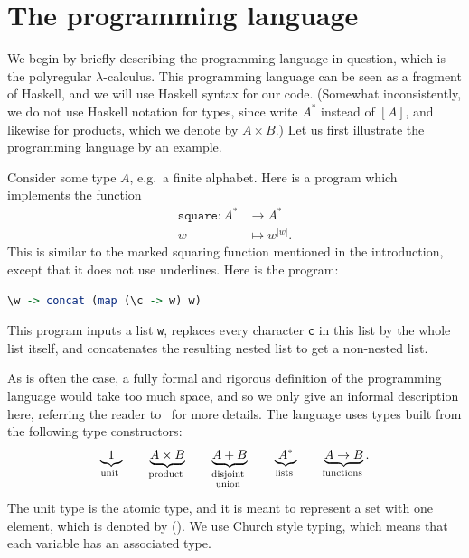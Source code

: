 \documentclass{article}
\begin{document}
\section{The programming language}
\label{sec:programming-language}
\newcommand{\leftterm}{\mathtt{Left}}
\newcommand{\rightterm}{\mathtt{Right}}
\newcommand{\fstterm}{\mathtt{fst}}
\newcommand{\sndterm}{\mathtt{snd}}
\newcommand{\mapterm}{\mathtt{map}}
\newcommand{\casesterm}{\mathtt{either}}
\newcommand{\splitterm}{\mathtt{split}}
\newcommand{\multterm}{\mathtt{mult}}
\newcommand{\headtailterm}{\mathtt{headtail}}
\newcommand{\concatterm}{\mathtt{concat}}
\newcommand{\headterm}{\mathtt{head}}
\newcommand{\tailterm}{\mathtt{tail}}
\newcommand{\blockterm}{\mathtt{block}}

We begin by  briefly describing the programming language in question, which is the polyregular $\lambda$-calculus. 
This programming language can be seen as a fragment of Haskell, and we will use Haskell syntax for our code. (Somewhat inconsistently, we do not use Haskell notation for types, since write $A^*$ instead of $[A]$, and likewise for products, which we denote by $A \times B$.)  Let us first illustrate the programming language by an example.

\begin{myexample}\label{ex:squaring} Consider some type $A$, e.g.~a finite alphabet. 
Here is a program which implements the  function 
\begin{align*}
\mathtt{square} : A^* & \to A^* \\
w & \mapsto w^{|w|}.
\end{align*}
This is similar to the marked squaring function mentioned in the introduction, except that it does not use underlines. Here is the program:
\begin{lstlisting}[language=Haskell]
  \w -> concat (map (\c -> w) w)
\end{lstlisting}
This program inputs a list \texttt{w}, replaces every character \texttt{c} in this list by the whole list itself, and concatenates the resulting nested list to get a non-nested list. 
\end{myexample}

As is often the case, a fully formal and rigorous definition of the programming language would take too much space, and so we only give an informal description here, referring the reader to~\cite[Section 4]{polyregular-survey} for more details. The language uses types built from the following  type constructors:
\begin{align*}
    \myunderbrace{1}{unit}
    \qquad 
    \myunderbrace{A \times B}{product} \qquad 
    \myunderbrace{A + B}{disjoint\\ union} \qquad 
    \myunderbrace{A^*}{lists} \qquad 
    \myunderbrace{A \to B}{functions}.
\end{align*}
The unit type is the atomic type, and it is meant to represent a set with one element, which is denoted by (). We use Church style typing, which means that each variable has an associated type. 
\end{document}

